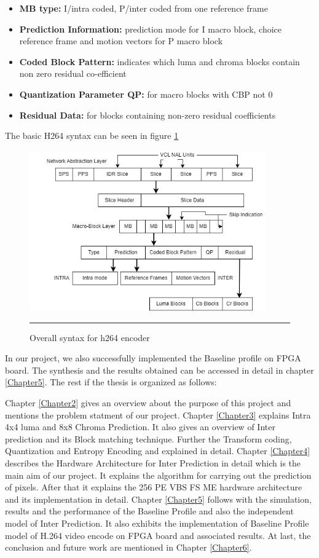 \begin{itemize}
	\item \textbf{MB type:} I/intra coded, P/inter coded from one reference frame
	\item \textbf{Prediction Information:} prediction mode for I macro block, choice reference frame and motion vectors for P macro block
	\item \textbf{Coded Block Pattern:} indicates which luma and chroma blocks contain non zero residual co-efficient
	\item \textbf{Quantization Parameter QP:} for macro blocks with CBP not 0
	\item \textbf{Residual Data:} for blocks containing non-zero residual coefficients
\end{itemize}

The basic H264 syntax can be seen in figure \ref{fig:syntax}
\begin{figure}[H]
	\centering
	\includegraphics[width = 4in]{./Figures/syntax.png}
	\rule{35em}{0.5pt}
	\caption{Overall syntax for h264 encoder}
	\label{fig:syntax}
\end{figure}

In our project, we also successfully implemented the Baseline profile on FPGA board. The synthesis and the results obtained can be accessed in detail in chapter \ref{Chapter5}. The rest if the thesis is organized as follows:

Chapter \ref{Chapter2} gives an overview about the purpose of this project and mentions the problem statment of our project. Chapter \ref{Chapter3} explains Intra 4x4 luma and 8x8 Chroma Prediction. It also gives an overview of Inter prediction and its Block matching technique. Further the Transform coding, Quantization and Entropy Encoding and explained in detail. Chapter \ref{Chapter4} describes the Hardware Architecture for Inter Prediction in detail which is the main aim of our project. It explains the algorithm for carrying out the prediction of pixels. After that it explains the 256 PE VBS FS ME hardware architecture and its implementation in detail. Chapter \ref{Chapter5} follows with the simulation, results and the performance of the Baseline Profile and also the independent model of Inter Prediction. It also exhibits the implementation of Baseline Profile model of H.264 video encode on FPGA board and associated results. At last, the conclusion and future work are mentioned in Chapter \ref{Chapter6}. 